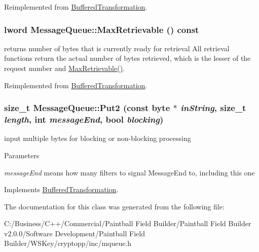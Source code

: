 Reimplemented from \hyperlink{class_buffered_transformation_aa7adffcae350fe528520a2427b21c0a9}{BufferedTransformation}.\hypertarget{class_message_queue_a636d1842ab46a50cdb8517aec0df6c5d}{
\subsubsection[{MaxRetrievable}]{\setlength{\rightskip}{0pt plus 5cm}lword MessageQueue::MaxRetrievable () const}}
\label{class_message_queue_a636d1842ab46a50cdb8517aec0df6c5d}


returns number of bytes that is currently ready for retrieval All retrieval functions return the actual number of bytes retrieved, which is the lesser of the request number and \hyperlink{class_message_queue_a636d1842ab46a50cdb8517aec0df6c5d}{MaxRetrievable()}. 

Reimplemented from \hyperlink{class_buffered_transformation_adf6654e3996270394552d67d2fda95d7}{BufferedTransformation}.\hypertarget{class_message_queue_a3ca42e60e7de1cfada145609cb3eb5e9}{
\subsubsection[{Put2}]{\setlength{\rightskip}{0pt plus 5cm}size\_\-t MessageQueue::Put2 (const byte $\ast$ {\em inString}, \/  size\_\-t {\em length}, \/  int {\em messageEnd}, \/  bool {\em blocking})}}
\label{class_message_queue_a3ca42e60e7de1cfada145609cb3eb5e9}


input multiple bytes for blocking or non-\/blocking processing 
\begin{DoxyParams}{Parameters}
\item[{\em messageEnd}]means how many filters to signal MessageEnd to, including this one \end{DoxyParams}


Implements \hyperlink{class_buffered_transformation_ad396dcb42260f23125a35ec0e5d17d55}{BufferedTransformation}.

The documentation for this class was generated from the following file:\begin{DoxyCompactItemize}
\item 
C:/Business/C++/Commercial/Paintball Field Builder/Paintball Field Builder v2.0.0/Software Development/Paintball Field Builder/WSKey/cryptopp/inc/mqueue.h\end{DoxyCompactItemize}
